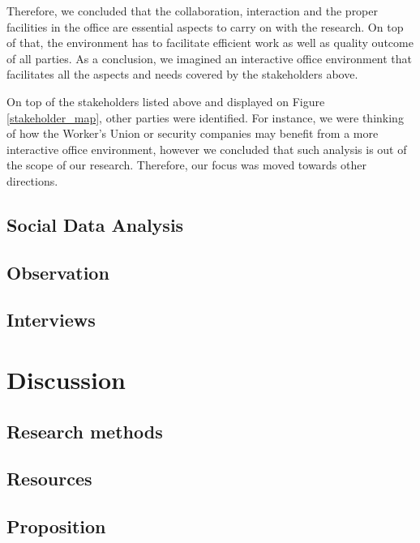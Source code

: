 \documentclass[english]{tktltiki}
\begin{document}
Therefore, we concluded that the collaboration, interaction and the proper facilities in the office are essential aspects to carry on with the research. On top of that, the environment has to facilitate efficient work as well as quality outcome of all parties. As a conclusion, we imagined an interactive office environment that facilitates all the aspects and needs covered by the stakeholders above. 

On top of the stakeholders listed above and displayed on Figure \ref{stakeholder_map}, other parties were identified. For instance, we were thinking of how the Worker's Union or security companies may benefit from a more interactive office environment, however we concluded that such analysis is out of the scope of our research. Therefore, our focus was moved towards other directions. 

\subsection{Social Data Analysis}


\subsection{Observation}


\subsection{Interviews}


\section{Discussion}
\subsection{Research methods}

\subsection{Resources}



\subsection{Proposition}
\end{document}
